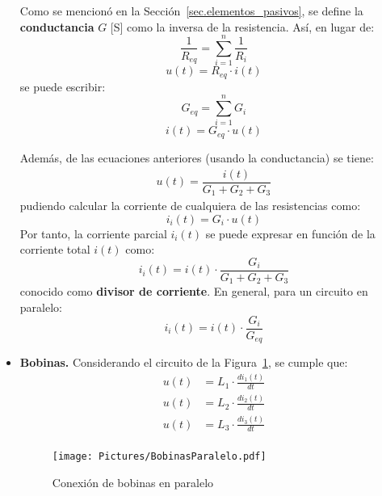 \documentclass[11pt]{book} %
\numberwithin{dummy}{section}
\theoremstyle{ocrenumbox}
\theoremstyle{blacknumex}
\theoremstyle{blacknumbox}
\theoremstyle{ocrenum}
\begin{document}
\begin{itemize}
		Como se mencionó en la Sección~\ref{sec.elementos_pasivos}, se define la \textbf{conductancia} $G$ [S] como la inversa de la resistencia. Así, en lugar de:
		\begin{equation*}
			\dfrac{1}{R_{eq}} = \sum_{i = 1}^n \dfrac{1}{R_i}
		\end{equation*}
		\begin{equation*}
			u(t) = R_{eq} \cdot i(t)
		\end{equation*}
		se puede escribir:
		\begin{equation}
			\boxed{G_{eq} = \sum_{i = 1}^n G_i}
		\end{equation}
		\begin{equation*}
			i(t) = G_{eq} \cdot u(t)
		\end{equation*}
		
		Además, de las ecuaciones anteriores (usando la conductancia) se tiene:
		\begin{align*}
			u(t) = \dfrac{i(t)}{G_1 + G_2 + G_3}
		\end{align*}
		pudiendo calcular la corriente de cualquiera de las resistencias como: 
		\begin{equation*}
			i_i(t) = G_i \cdot u(t)
		\end{equation*}
		Por tanto, la corriente parcial $i_i(t)$ se puede expresar en función de la corriente total $i(t)$ como: 
		\begin{equation*}
			i_i(t) = i(t) \cdot \dfrac{G_i}{G_1 + G_2 + G_3}
		\end{equation*}
		conocido como \textbf{divisor de corriente}. En general, para un circuito en paralelo:
		\begin{equation}
			\boxed{i_i(t) = i(t) \cdot \frac{G_i}{G_{eq}}}
		\end{equation}
		\item \textbf{Bobinas.} Considerando el circuito de la Figura~\ref{fig.bobinas-paralelo}, se cumple que:
		\begin{align*}
			u(t) &= L_1 \cdot \frac{di_1(t)}{dt}\\
			u(t) &= L_2 \cdot \frac{di_2(t)}{dt}\\
			u(t) &= L_3 \cdot \frac{di_3(t)}{dt}\\
		\end{align*}
		\begin{figure}[htbp]
			\centering
			\texttt{[image: Pictures/BobinasParalelo.pdf]}
			\caption{Conexión de bobinas en paralelo}
			\label{fig.bobinas-paralelo}
		\end{figure}

\end{itemize}
\end{document}
